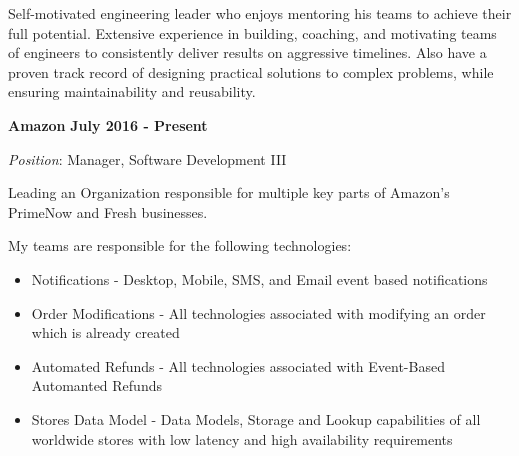 \documentclass{article}
\begin{document}
\par
\vspace{2\baselineskip}
\par
Self-motivated engineering leader who enjoys mentoring his teams to achieve their full potential. Extensive experience in building, coaching, and motivating teams of engineers to consistently deliver results on aggressive timelines. Also have a proven track record of designing practical solutions to complex problems, while ensuring maintainability and reusability.
\par
\vspace{\baselineskip}
\vspace{\baselineskip}
{\bf Amazon}
\hfill {\bf July 2016 - Present}
\vspace{.03in}
\par
{\it Position}: Manager, Software Development III
\vspace{\baselineskip}
\par
Leading an Organization responsible for multiple key parts of Amazon's PrimeNow and Fresh businesses.  
\par
\vspace{\baselineskip}
My teams are responsible for the following technologies:
\begin{small}
\begin{itemize}
  \item Notifications - Desktop, Mobile, SMS, and Email event based notifications
  \item Order Modifications - All technologies associated with modifying an order which is already created
  \item Automated Refunds - All technologies associated with Event-Based Automanted Refunds
  \item Stores Data Model - Data Models, Storage and Lookup capabilities of all worldwide stores with low latency and high availability requirements
\end{itemize}
\end{small}
\end{document}
